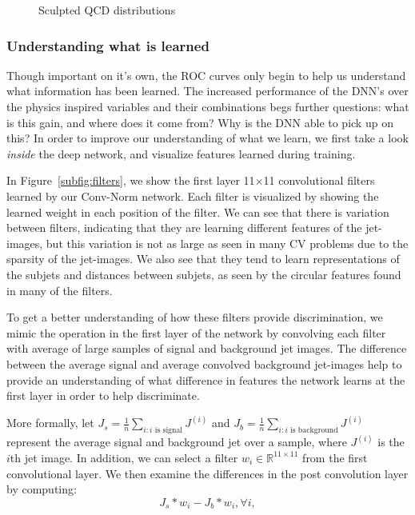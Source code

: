 \begin{figure}[htbp!]
\begin{center}
      \caption{Sculpted QCD distributions}
      \label{fig:qcdsculpt}

    \end{center}
\end{figure}

\subsubsection{Understanding what is learned} %
\label{ssub:understanding_what_is_learned}

Though important on it's own, the ROC curves only begin to help us understand what information has been learned. The increased performance of the DNN's over the physics inspired variables and their combinations begs further questions: what is this gain, and where does it come from? Why is the DNN able to pick up on this? In order to improve our understanding of what we learn, we first take a look \emph{inside} the deep network, and visualize features learned during training.


In Figure~\ref{subfig:filters}, we show the first layer 11$\times$11 convolutional filters learned by our Conv-Norm network. Each filter is visualized by showing the learned weight in each position of the filter.  We can see that there is variation between filters, indicating that they are learning different features of the jet-images, but this variation is not as large as seen in many CV problems due to the sparsity of the jet-images.  We also see that they tend to learn representations of the subjets and distances between subjets, as seen by the circular features found in many of the filters.

To get a better understanding of how these filters provide discrimination, we mimic the operation in the first layer of the network by convolving each filter with average of large samples of signal and background jet images.  The difference between the average signal and average convolved background jet-images help to provide an understanding of what difference in features the network learns at the first layer in order to help discriminate.

More formally, let $J_s=\frac{1}{n}\sum_{i:i\text{ is signal}} J^{(i)}$ and $J_b=\frac{1}{n}\sum_{i:i\text{ is background}}J^{(i)}$ represent the average signal and background jet over a sample, where $J^{(i)}$ is the $i$th jet image. In addition, we can select a filter $w_i\in\mathbb{R}^{11\times11}$ from the first convolutional layer. We then examine the differences in the post convolution layer by computing:
\begin{equation}
  J_s \ast w_i - J_b \ast w_i, \forall i,
\end{equation}

